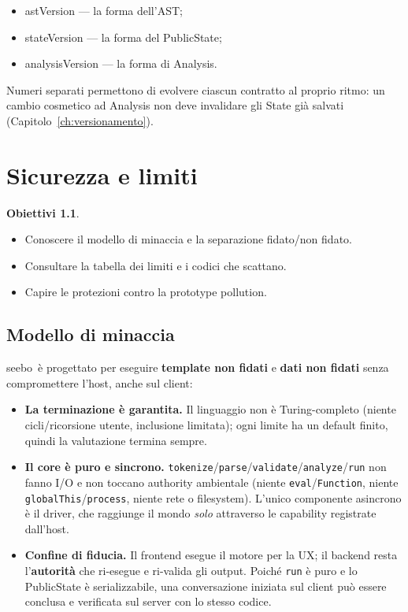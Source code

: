 \documentclass[11pt,a4paper]{book}
\let\code\lstinline
\newcommand{\ic}[1]{{\ttfamily #1}}
\theoremstyle{definition}
\newtheorem*{obiettivi}{Obiettivi}
\newcommand{\seebo}{\textsf{seebo}}
\begin{document}
{{{{\begin{itemize}
  \item \ic{astVersion} --- la forma dell'AST;
  \item \ic{stateVersion} --- la forma del \ic{PublicState};
  \item \ic{analysisVersion} --- la forma di \ic{Analysis}.
\end{itemize}

Numeri separati permettono di evolvere ciascun contratto al proprio ritmo: un
cambio cosmetico ad \ic{Analysis} non deve invalidare gli \ic{State} già salvati
(Capitolo~\ref{ch:versionamento}).

\chapter{Sicurezza e limiti}
\label{ch:sicurezza}

\begin{obiettivi}
\begin{itemize}
  \item Conoscere il modello di minaccia e la separazione fidato/non fidato.
  \item Consultare la tabella dei limiti e i codici che scattano.
  \item Capire le protezioni contro la prototype pollution.
\end{itemize}
\end{obiettivi}

\section{Modello di minaccia}

\seebo\ è progettato per eseguire \textbf{template non fidati} e \textbf{dati non
fidati} senza compromettere l'host, anche sul client:

\begin{itemize}
  \item \textbf{La terminazione è garantita.} Il linguaggio non è Turing-completo
    (niente cicli/ricorsione utente, inclusione limitata); ogni limite ha un default
    finito, quindi la valutazione termina sempre.
  \item \textbf{Il core è puro e sincrono.} \code|tokenize|/\code|parse|/\code|validate|/\code|analyze|/\code|run|
    non fanno I/O e non toccano authority ambientale (niente \code|eval|/\code|Function|,
    niente \code|globalThis|/\code|process|, niente rete o filesystem). L'unico
    componente asincrono è il driver, che raggiunge il mondo \emph{solo} attraverso
    le capability registrate dall'host.
  \item \textbf{Confine di fiducia.} Il frontend esegue il motore per la UX; il
    backend resta l'\textbf{autorità} che ri-esegue e ri-valida gli output. Poiché
    \code|run| è puro e lo \ic{PublicState} è serializzabile, una conversazione
    iniziata sul client può essere conclusa e verificata sul server con lo stesso
    codice.
\end{itemize}

}}}}
\end{document}
